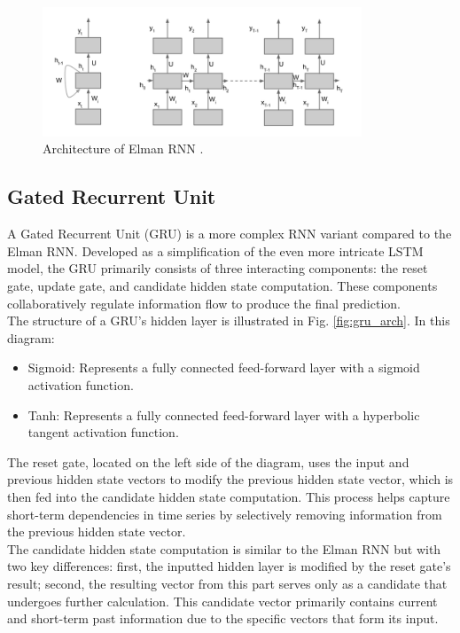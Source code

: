 \begin{figure}[!h]
	\centering
	
	\includegraphics[width=0.85\textwidth]{images/Elman_RNN_architecture.png}
	
	\caption{Architecture of Elman RNN \cite{elman_img}.}
	\label{fig:elman_arch}
\end{figure}

\subsection{Gated Recurrent Unit}

A Gated Recurrent Unit (GRU) is a more complex RNN variant compared to the Elman RNN. Developed as a simplification of the even more intricate LSTM model, the GRU primarily consists of three interacting components: the reset gate, update gate, and candidate hidden state computation. These components collaboratively regulate information flow to produce the final prediction.
\\

The structure of a GRU’s hidden layer is illustrated in Fig. \ref{fig:gru_arch}. In this diagram:

\begin{itemize}
	\item Sigmoid: Represents a fully connected feed-forward layer with a sigmoid activation function.
	\item Tanh: Represents a fully connected feed-forward layer with a hyperbolic tangent activation function.
\end{itemize}

The reset gate, located on the left side of the diagram, uses the input and previous hidden state vectors to modify the previous hidden state vector, which is then fed into the candidate hidden state computation. This process helps capture short-term dependencies in time series by selectively removing information from the previous hidden state vector.
\\

The candidate hidden state computation is similar to the Elman RNN but with two key differences: first, the inputted hidden layer is modified by the reset gate's result; second, the resulting vector from this part serves only as a candidate that undergoes further calculation. This candidate vector primarily contains current and short-term past information due to the specific vectors that form its input.
\\

